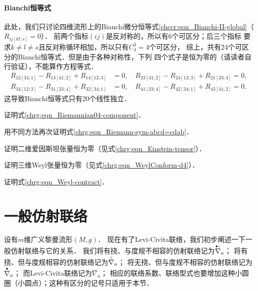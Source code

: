 \paragraph{Bianchi恒等式}\label{chrg:sec_NumOfBianchi}
此处，我们只讨论四维流形上的Bianchi微分恒等式\eqref{chccr:eqn_Bianchi-II-global}（$R_{ij[kl;s]} = 0$）．
前两个指标$(ij)$是反对称的，所以有6个可区分；后三个指标
要求$k\neq l \neq s$且反对称循环相加，所以只有$C_4^3=4$个可区分，
综上，共有24个可区分的Bianchi恒等式．但是由于各种对称性，下列
四个式子是恒为零的（请读者自行验证），不能算作方程等式．
\begin{equation*}
    \begin{aligned}
        R_{12[34;1]} - R_{13[41;2]} + R_{14[12;3]} &=0,  \quad
        R_{23[41;2]} - R_{24[12;3]} + R_{21[23;4]} =0,  \\
        R_{34[12;3]} - R_{31[23;4]} + R_{32[34;1]} &=0,  \quad
        R_{41[23;4]} - R_{42[34;1]} + R_{43[41;2]} =0.
    \end{aligned}
\end{equation*}
这导致Bianchi恒等式只有20个线性独立．


\begin{exercise}
	证明式\eqref{chrg:eqn_Riemannian04-component}．
\end{exercise}

\begin{exercise}
	用不同方法再次证明式\eqref{chrg:eqn_Riemann-sym-abcd=cdab}．
\end{exercise}

\begin{exercise}
	证明二维爱因斯坦张量恒为零（见式\eqref{chrg:eqn_Einstein-tensor}）．
\end{exercise}

\begin{exercise}
	证明三维Weyl张量恒为零（见式\eqref{chrg:eqn_WeylConform-d4}）．
\end{exercise}

\begin{exercise}
	证明式\eqref{chrg:eqn_Weyl-contract}．
\end{exercise}



\section{一般仿射联络}\label{chrg:sec_metric-affine}

设有$m$维广义黎曼流形$(M,g)$．
现在有了Levi-Civita联络，我们初步阐述一下一般仿射联络与它的关系．
我们将有挠、与度规不相容的仿射联络记为$\oversetmy{\bullet\circ}{\nabla}_a$；
将有挠、但与度规相容的仿射联络记为$\oversetmy{\circ}{\nabla}_a$；
将无挠、但与度规不相容的仿射联络记为$\oversetmy{\bullet}{\nabla}_a$；
而Levi-Civita联络记为$\nabla_a$；
相应的联络系数、联络型式也要增加这种小圆圈（小圆点）；这种有区分的记号只适用于本节．

